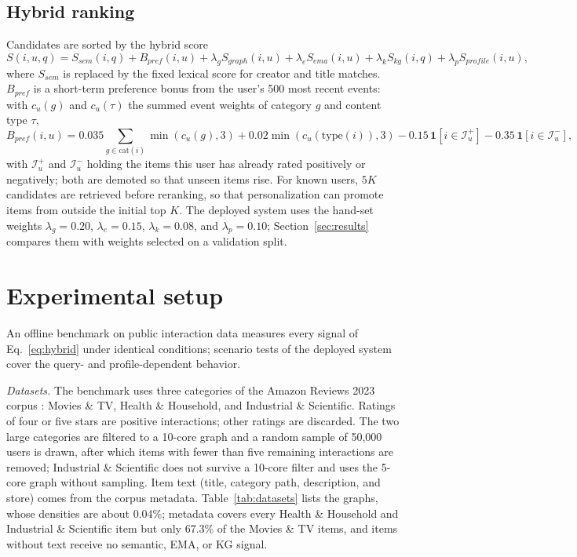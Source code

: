 \documentclass[3p,times,procedia]{elsarticle}
\begin{document}
\subsection{Hybrid ranking}
\label{sec:hybrid}
Candidates are sorted by the hybrid score
\begin{equation}
    S(i,u,q)=S_{\mathit{sem}}(i,q)+B_{\mathit{pref}}(i,u)+
    \lambda_gS_{\mathit{graph}}(i,u)+
    \lambda_eS_{\mathit{ema}}(i,u)+
    \lambda_kS_{\mathit{kg}}(i,q)+
    \lambda_pS_{\mathit{profile}}(i,u),
    \label{eq:hybrid}
\end{equation}
where $S_{\mathit{sem}}$ is replaced by the fixed lexical score for creator and title matches. $B_{\mathit{pref}}$ is a short-term preference bonus from the user's 500 most recent events: with $c_u(g)$ and $c_u(\tau)$ the summed event weights of category $g$ and content type $\tau$,
\begin{equation}
    B_{\mathit{pref}}(i,u)=0.035\!\sum_{g\in\mathrm{cat}(i)}\!\min(c_u(g),3)+0.02\min(c_u(\mathrm{type}(i)),3)-0.15\,\mathbf{1}[i\in\mathcal{I}^{+}_u]-0.35\,\mathbf{1}[i\in\mathcal{I}^{-}_u],
    \label{eq:pref}
\end{equation}
with $\mathcal{I}^{+}_u$ and $\mathcal{I}^{-}_u$ holding the items this user has already rated positively or negatively; both are demoted so that unseen items rise. For known users, $5K$ candidates are retrieved before reranking, so that personalization can promote items from outside the initial top $K$. The deployed system uses the hand-set weights $\lambda_g=0.20$, $\lambda_e=0.15$, $\lambda_k=0.08$, and $\lambda_p=0.10$; Section~\ref{sec:results} compares them with weights selected on a validation split.

\section{Experimental setup}
\label{sec:setup}
An offline benchmark on public interaction data measures every signal of Eq.~\eqref{eq:hybrid} under identical conditions; scenario tests of the deployed system cover the query- and profile-dependent behavior.

\emph{Datasets.} The benchmark uses three categories of the Amazon Reviews 2023 corpus \cite{hou2024blair}: Movies \& TV, Health \& Household, and Industrial \& Scientific. Ratings of four or five stars are positive interactions; other ratings are discarded. The two large categories are filtered to a 10-core graph and a random sample of 50,000 users is drawn, after which items with fewer than five remaining interactions are removed; Industrial \& Scientific does not survive a 10-core filter and uses the 5-core graph without sampling. Item text (title, category path, description, and store) comes from the corpus metadata. Table~\ref{tab:datasets} lists the graphs, whose densities are about 0.04\%; metadata covers every Health \& Household and Industrial \& Scientific item but only 67.3\% of the Movies \& TV items, and items without text receive no semantic, EMA, or KG signal.
\end{document}

